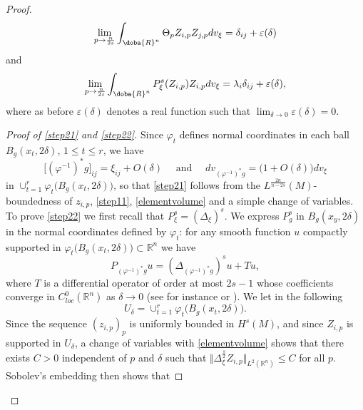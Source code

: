 \documentclass[10pt]{amsart}
\numberwithin{equation}{section}
\newcommand{\R}{\mathbb{R}}
\def\de{{\delta}}
\def\ep{{\varepsilon}}
\def\phi{{\varphi}}
\gdef\mR{\doba{R}}
\newcommand{\ve}{\varepsilon}
\newcommand{\vp}{\varphi}
\def \ep{\epsilon}
\theoremstyle{plain}
\theoremstyle{remark}
\begin{document}
\begin{proof}
\begin{equation}
\lim_{p \to \frac{n}{2s}} \int_{\mR^n} \Theta_p Z_{i,p} Z_{j,p} dv_\xi = \delta_{ij} + \ve(\delta)
\end{equation}
and 
\begin{equation} \label{step22}
\lim_{p \to \frac{n}{2s}}  \int_{\mR^n} P_\xi^s (Z_{i,p}) Z_{i,p} dv_\xi  =\lambda_i  \delta_{ij} + \ve(\delta),
\end{equation}
where as before $\ve(\delta)$ denotes a real function such that $\lim_{\delta \to 0} \ve(\delta) = 0$.   

\begin{proof}[Proof of \eqref{step21} and \eqref{step22}]
Since $\vp_t$ defines normal coordinates in each ball $B_g(x_t, 2\delta)$, $1 \le t \le r$, we have 
\begin{equation} \label{elementvolume}
\big[(\vp^{-1})^*g\big]_{ij} = \xi_{ij} + O(\delta) \quad \text{ and } \quad dv_{(\vp^{-1})^*g} = \big(1+ O(\delta) \big) dv_{\xi}
\end{equation} in  $\cup_{t=1}^r \phi_t\big( B_g(x_t,2 \de) \big)$, so that \eqref{step21} follows from the $L^{\frac{2n}{n-2s}}(M)$-boundedness of $z_{i,p}$,  \eqref{step11}, \eqref{elementvolume} and a simple change of variables. To prove \eqref{step22} we first recall that $P_{\xi}^s = (\Delta_{\xi})^s$. We express $P_g^s$ in $B_g(x_y, 2 \delta)$ in the normal coordinates defined by $\vp_t$: for any smooth function $u$ compactly supported in $\phi_t\big( B_g(x_t,2 \de) \big) \subset \R^n$ we have
\begin{equation} \label{eq:ajout:1}
 P_{(\vp^{-1})^*g} u  = (\Delta_{(\vp^{-1})^*g} )^s u + Tu, 
 \end{equation}
where $T$ is a differential operator of order at most $2s-1$ whose coefficients converge in $C^0_{loc}(\R^n)$ as $\delta \to 0$ (see for instance \cite{Juhl} or \cite[Proposition 2.1]{MazumdarVetois}). We let in the following 
$$ U_\delta = \cup_{t=1}^r \phi_t\big( B_g(x_t,2 \de) \big).$$
Since the sequence $(z_{i,p})_p$ is uniformly bounded in $H^s(M)$, and since $Z_{i,p}$ is supported in $U_\delta$, a change of variables with \eqref{elementvolume} shows that there exists $C >0$ independent of $p$ and $\delta$ such that $ \Vert \Delta_\xi^{\frac{s}{2}} Z_{i,p} \Vert_{L^2(\R^n)}\le C$
for all $p$. Sobolev's embedding then shows that 

\end{proof}
\end{proof}
\end{document}
